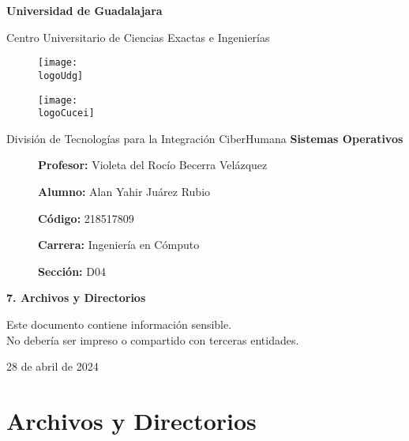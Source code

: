 \documentclass[12pt, a4paper]{article} %
\title{\theTitle}
\author{\theAuthor}
\newcommand{\logoUdg}{../../../../attachments/images/portada-udg.jpeg}
\newcommand{\logoCucei}{../../../../attachments/images/portada-cucei.jpeg}
\newcommand{\materia}{Sistemas Operativos}
\newcommand{\theTitle}{7. Archivos y Directorios}
\newcommand{\profesor}{Violeta del Rocío Becerra Velázquez}
\newcommand{\theAuthor}{Alan Yahir Juárez Rubio}
\newcommand{\code}{218517809}
\newcommand{\carrera}{Ingeniería en Cómputo}
\newcommand{\seccion}{D04}
\newcommand{\startDate}{28 de abril de 2024}
\newcommand{\nl}{\par\vspace{0.4cm}}
\begin{document}
\cfoot{\ifodd\value{page}\else\thepage\fi} %

\begin{titlepage}
	\centering
	{\huge\textbf{Universidad de Guadalajara}}\par\vspace{0.6cm}
	{\LARGE{Centro Universitario de Ciencias Exactas e Ingenierías}}\vfill
	
	\begin{figure}[h]
		\begin{minipage}[t]{0.45\textwidth}
			\centering
			\texttt{[image: \\logoUdg]}
		\end{minipage}
		\hfill
		\begin{minipage}[t]{0.45\textwidth}
			\centering
			\texttt{[image: \\logoCucei]}
		\end{minipage}
	\end{figure}\vfill
	
	{\Large{División de Tecnologías para la Integración CiberHumana}}\vfill
	{\Large\textbf{\materia}}\vfill
	\begin{figure}[h]
		\centering
		\begin{minipage}[t]{0.75\textwidth}
			{\Large
				\textbf{Profesor:} \profesor\nl
				\textbf{Alumno:} \theAuthor\nl
				\textbf{Código:} \code\nl
				\textbf{Carrera:} \carrera\nl
				\textbf{Sección:} \seccion
			}
		\end{minipage}
	\end{figure}\vfill
	{\LARGE{\textbf{\theTitle}}}\vfill
	
	\begin{tcolorbox}[colback=red!5!white, colframe=red!75!black]
		\centering
		Este documento contiene información sensible.\\
		No debería ser impreso o compartido con terceras entidades.
	\end{tcolorbox}\vfill
	{\large \startDate}\par
\end{titlepage}

\clearpage
\tableofcontents

\clearpage
\listoffigures
	

\clearpage
\section{Archivos y Directorios}
\end{document}
